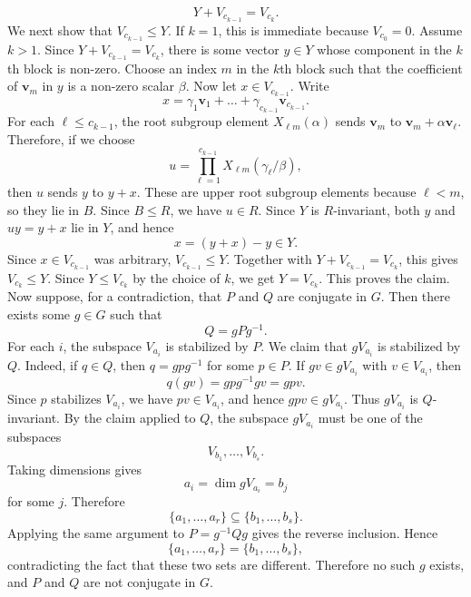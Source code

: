 \documentclass[../Odyssey_Project.tex]{subfiles}
\begin{document}
\begin{solution}
\begin{enumerate}
    \[
        Y+V_{c_{k-1}}=V_{c_k}.
    \]
    We next show that $V_{c_{k-1}}\leq Y$. If $k=1$, this is immediate because $V_{c_0}=0$. Assume $k>1$. Since $Y+V_{c_{k-1}}=V_{c_k}$, there is some vector $y\in Y$ whose component in the $k$th block is non-zero. Choose an index $m$ in the $k$th block such that the coefficient of $\mathbf{v}_m$ in $y$ is a non-zero scalar $\beta$. Now let $x\in V_{c_{k-1}}$. Write
    \[
        x=\gamma_1\mathbf{v}_1+\dots+\gamma_{c_{k-1}}\mathbf{v}_{c_{k-1}}.
    \]
    For each $\ell\leq c_{k-1}$, the root subgroup element $X_{\ell m}(\alpha)$ sends $\mathbf{v}_m$ to $\mathbf{v}_m+\alpha\mathbf{v}_\ell$. Therefore, if we choose
    \[
        u=\prod_{\ell=1}^{c_{k-1}}X_{\ell m}(\gamma_\ell/\beta),
    \]
    then $u$ sends $y$ to $y+x$. These are upper root subgroup elements because $\ell<m$, so they lie in $B$. Since $B\leq R$, we have $u\in R$. Since $Y$ is $R$-invariant, both $y$ and $uy=y+x$ lie in $Y$, and hence
    \[
        x=(y+x)-y\in Y.
    \]
    Since $x\in V_{c_{k-1}}$ was arbitrary, $V_{c_{k-1}}\leq Y$. Together with $Y+V_{c_{k-1}}=V_{c_k}$, this gives $V_{c_k}\leq Y$. Since $Y\leq V_{c_k}$ by the choice of $k$, we get $Y=V_{c_k}$. This proves the claim.\\
    Now suppose, for a contradiction, that $P$ and $Q$ are conjugate in $G$. Then there exists some $g\in G$ such that
    \[
        Q=gPg^{-1}.
    \]
    For each $i$, the subspace $V_{a_i}$ is stabilized by $P$. We claim that $gV_{a_i}$ is stabilized by $Q$. Indeed, if $q\in Q$, then $q=gpg^{-1}$ for some $p\in P$. If $gv\in gV_{a_i}$ with $v\in V_{a_i}$, then
    \[
        q(gv)=gpg^{-1}gv=gpv.
    \]
    Since $p$ stabilizes $V_{a_i}$, we have $pv\in V_{a_i}$, and hence $gpv\in gV_{a_i}$. Thus $gV_{a_i}$ is $Q$-invariant. By the claim applied to $Q$, the subspace $gV_{a_i}$ must be one of the subspaces
    \[
        V_{b_1},\dots,V_{b_s}.
    \]
    Taking dimensions gives
    \[
        a_i=\dim gV_{a_i}=b_j
    \]
    for some $j$. Therefore
    \[
        \{a_1,\dots,a_r\}\subseteq \{b_1,\dots,b_s\}.
    \]
    Applying the same argument to $P=g^{-1}Qg$ gives the reverse inclusion. Hence
    \[
        \{a_1,\dots,a_r\}=\{b_1,\dots,b_s\},
    \]
    contradicting the fact that these two sets are different. Therefore no such $g$ exists, and $P$ and $Q$ are not conjugate in $G$.


\end{enumerate}
\end{solution}
\end{document}
